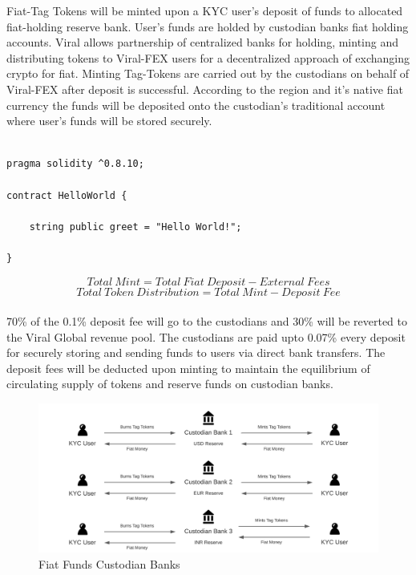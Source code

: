 \documentclass[10pt]{article}
\begin{document}
Fiat-Tag Tokens will be minted upon a KYC user's deposit of funds to allocated fiat-holding reserve bank. User's funds are holded by custodian banks fiat holding accounts. Viral allows partnership of centralized banks for holding, minting and distributing tokens to Viral-FEX users for a decentralized approach of exchanging crypto for fiat. Minting Tag-Tokens are carried out by the  custodians on behalf of Viral-FEX after deposit is successful. According to the region and it's native fiat currency the funds will be deposited onto the custodian's traditional account where user's funds will be stored securely.\\

\begin{lstlisting}[language=Solidity, caption={Custodian Mint}, numbers=none]

pragma solidity ^0.8.10;

contract HelloWorld {

    string public greet = "Hello World!";
    
}
\end{lstlisting}

\begin{equation}
Total\:Mint=Total\:Fiat\:Deposit-External\:Fees
\end{equation}
\begin{equation}
Total\:Token\:Distribution=Total\:Mint-Deposit\:Fee
\end{equation}\\

70\% of the 0.1\% deposit fee will go to the custodians and 30\% will be reverted to the Viral Global revenue pool. The custodians are paid upto 0.07\% every deposit for securely storing and sending funds to users via direct bank transfers. The deposit fees will be deducted upon minting to maintain the equilibrium of circulating supply of tokens and reserve funds on custodian banks.\\

\begin{figure}[H]
\begin{center}
\includegraphics[width=\textwidth]{custodian}
\caption{Fiat Funds Custodian Banks}
\end{center}
\end{figure}
\end{document}
